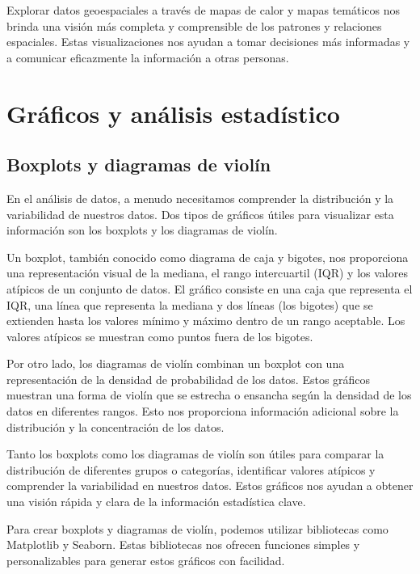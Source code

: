 \documentclass[
  a4paper,
]{article}
\begin{document}
Explorar datos geoespaciales a través de mapas de calor y mapas
temáticos nos brinda una visión más completa y comprensible de los
patrones y relaciones espaciales. Estas visualizaciones nos ayudan a
tomar decisiones más informadas y a comunicar eficazmente la información
a otras personas.

\hypertarget{gruxe1ficos-y-anuxe1lisis-estaduxedstico}{%
\section{Gráficos y análisis
estadístico}\label{gruxe1ficos-y-anuxe1lisis-estaduxedstico}}

\hypertarget{boxplots-y-diagramas-de-violuxedn}{%
\subsection{Boxplots y diagramas de
violín}\label{boxplots-y-diagramas-de-violuxedn}}

En el análisis de datos, a menudo necesitamos comprender la distribución
y la variabilidad de nuestros datos. Dos tipos de gráficos útiles para
visualizar esta información son los boxplots y los diagramas de violín.

Un boxplot, también conocido como diagrama de caja y bigotes, nos
proporciona una representación visual de la mediana, el rango
intercuartil (IQR) y los valores atípicos de un conjunto de datos. El
gráfico consiste en una caja que representa el IQR, una línea que
representa la mediana y dos líneas (los bigotes) que se extienden hasta
los valores mínimo y máximo dentro de un rango aceptable. Los valores
atípicos se muestran como puntos fuera de los bigotes.

Por otro lado, los diagramas de violín combinan un boxplot con una
representación de la densidad de probabilidad de los datos. Estos
gráficos muestran una forma de violín que se estrecha o ensancha según
la densidad de los datos en diferentes rangos. Esto nos proporciona
información adicional sobre la distribución y la concentración de los
datos.

Tanto los boxplots como los diagramas de violín son útiles para comparar
la distribución de diferentes grupos o categorías, identificar valores
atípicos y comprender la variabilidad en nuestros datos. Estos gráficos
nos ayudan a obtener una visión rápida y clara de la información
estadística clave.

Para crear boxplots y diagramas de violín, podemos utilizar bibliotecas
como Matplotlib y Seaborn. Estas bibliotecas nos ofrecen funciones
simples y personalizables para generar estos gráficos con facilidad.
\end{document}
